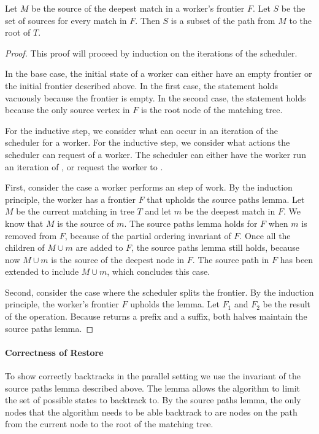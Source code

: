 \begin{lemma}
Let $M$ be the source of the deepest match in a worker's frontier $F$.
%
Let $S$ be the set of sources for every match in $F$.
%
Then $S$ is a subset of the path from $M$ to the root
of $T$.
\end{lemma}

\begin{proof}
This proof will proceed by induction on the iterations
of the scheduler.

In the base case, the initial state of a worker can either have an
empty frontier or the initial frontier
described above.
%
In the first case, the statement holds vacuously
because the frontier is empty.
%
In the second case, the statement holds because the only
source vertex in $F$ is the root node of the matching tree.

For the inductive step, we consider what can occur
in an iteration of the scheduler for a worker.
%
For the inductive step, we consider what actions
the scheduler can request of a worker.
The scheduler can either have the worker run an iteration of ,
or request the worker to .

First, consider the case a worker performs an step of work.
%
By the induction principle, the worker has a
frontier $F$ that upholds the source paths lemma.
%
Let $M$ be the current matching in tree $T$ and let $m$ be the deepest
match in $F$.
%
We know that $M$ is the source of $m$.
%
The source paths lemma holds for $F$ when $m$ is
removed from $F$, because of the partial ordering invariant of $F$.
%
Once all the children of $M \cup m$ are added to $F$,
the source paths lemma still holds, because now
$M \cup m$ is the source of the deepest node in $F$.
%
The source path in $F$ has been extended to include
$M \cup m$, which concludes this case.

Second, consider the case where the scheduler splits the frontier.
%
By the induction principle, the worker's frontier $F$
upholds the lemma.
%
Let $F_1$ and $F_2$ be the result of the  operation.
%
Because  returns a prefix and a suffix, both halves maintain
the source paths lemma.
\end{proof}

\paragraph{Correctness of Restore}
To show  correctly backtracks
in the parallel setting we use the invariant
of the source paths lemma described above.
%
The lemma allows the algorithm to limit
the set of possible states to backtrack to.
%
By the source paths lemma, the only nodes
that the algorithm needs to be able backtrack to
are nodes on the path from the current node to the root
of the matching tree.

